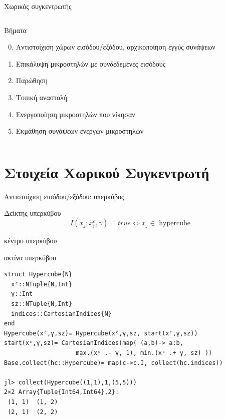\documentclass[10pt,lualatex]{beamer}
\begin{document}
\begin{frame}{Χωρικός συγκεντρωτής}
{\begin{columns}
\begin{block}{Βήματα}
\begin{enumerate}
        \setcounter{enumi}{-1}
        \item \alert<3>{Αντιστοίχιση χώρων εισόδου/εξόδου, αρχικοποίηση εγγύς συνάψεων}
        \item \alert<3>{Επικάλυψη μικροστηλών με συνδεδεμένες εισόδους}
        \item Παρώθηση
        \item Τοπική αναστολή
        \item Ενεργοποίηση μικροστηλών που νίκησαν
        \item \alert<3>{Εκμάθηση συνάψεων ενεργών μικροστηλών}
      \end{enumerate}
    \end{block}
  \end{columns}
  }
\end{frame}

\section{Στοιχεία Χωρικού Συγκεντρωτή}

\begin{frame}[fragile]{Αντιστοίχιση εισόδου/εξόδου: υπερκύβος}
\begin{block}{Δείκτης υπερκύβου}
  \[ I(x_j; x_i^c, γ) = \mathit{true} \iff x_j \in \text{ hypercube} \]
  \vspace{-2.2\topsep}
  \begin{description}[ddddd]
		\small
    \item[$x^c$] κέντρο υπερκύβου
    \item[$γ$] ακτίνα υπερκύβου
  \end{description}
\end{block}
\pause
\begin{verbatim}
struct Hypercube{N}
  xᶜ::NTuple{N,Int}
  γ::Int
  sz::NTuple{N,Int}
  indices::CartesianIndices{N}
end
Hypercube(xᶜ,γ,sz)= Hypercube(xᶜ,γ,sz, start(xᶜ,γ,sz))
start(xᶜ,γ,sz)= CartesianIndices(map( (a,b)-> a:b,
                    max.(xᶜ .- γ, 1), min.(xᶜ .+ γ, sz) ))
Base.collect(hc::Hypercube)= map(c->c.I, collect(hc.indices))

jl> collect(Hypercube((1,1),1,(5,5)))
2×2 Array{Tuple{Int64,Int64},2}:
 (1, 1)  (1, 2)
 (2, 1)  (2, 2)
\end{verbatim}
\end{frame}
\end{document}
